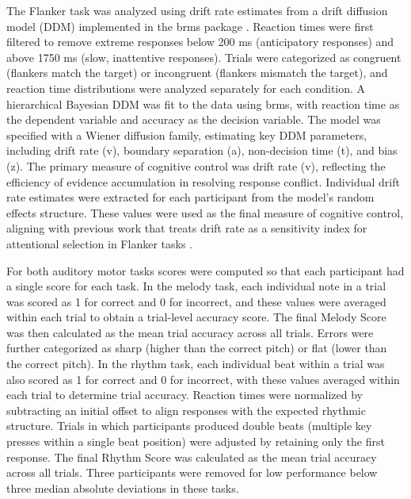 The Flanker task was analyzed using drift rate estimates from a drift diffusion model (DDM) implemented in the brms package \citep{burkner2017brms}. Reaction times were first filtered to remove extreme responses below 200 ms (anticipatory responses) and above 1750 ms (slow, inattentive responses). Trials were categorized as congruent (flankers match the target) or incongruent (flankers mismatch the target), and reaction time distributions were analyzed separately for each condition. A hierarchical Bayesian DDM was fit to the data using brms, with reaction time as the dependent variable and accuracy as the decision variable. The model was specified with a Wiener diffusion family, estimating key DDM parameters, including drift rate (v), boundary separation (a), non-decision time (t), and bias (z). The primary measure of cognitive control was drift rate (v), reflecting the efficiency of evidence accumulation in resolving response conflict. Individual drift rate estimates were extracted for each participant from the model’s random effects structure. These values were used as the final measure of cognitive control, aligning with previous work that treats drift rate as a sensitivity index for attentional selection in Flanker tasks \citep{poole2024putting}. 

For both auditory motor tasks scores were computed so that each participant had a single score for each task. In the melody task, each individual note in a trial was scored as 1 for correct and 0 for incorrect, and these values were averaged within each trial to obtain a trial-level accuracy score. The final Melody Score was then calculated as the mean trial accuracy across all trials. Errors were further categorized as sharp (higher than the correct pitch) or flat (lower than the correct pitch). In the rhythm task, each individual beat within a trial was also scored as 1 for correct and 0 for incorrect, with these values averaged within each trial to determine trial accuracy. Reaction times were normalized by subtracting an initial offset to align responses with the expected rhythmic structure. Trials in which participants produced double beats (multiple key presses within a single beat position) were adjusted by retaining only the first response. The final Rhythm Score was calculated as the mean trial accuracy across all trials. Three participants were removed for low performance below three median absolute deviations in these tasks.

